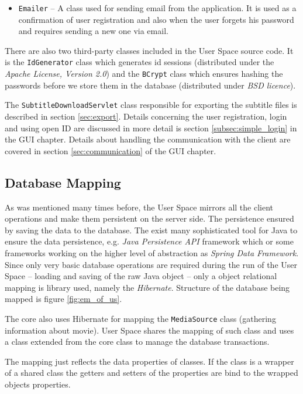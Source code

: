 \begin{itemize}
\item {\tt Emailer} -- A class used for sending email from the application. It is used as a confirmation of user registration and also when the user forgets his password and requires sending a new one via email.

\end{itemize}

There are also two third-party classes included in the User Space source code. It is the {\tt IdGenerator} class which generates id sessions (distributed under the {\it Apache License, Version 2.0}) and the {\tt BCrypt} class which ensures hashing the passwords before we store them in the database (distributed under {\it BSD licence}).

The {\tt SubtitleDownloadServlet} class responsible for exporting the subtitle files is described in section \ref{sec:export}. Details concerning the user registration, login and using open ID are discussed in more detail is section \ref{subsec:simple_login} in the GUI chapter. Details about handling the communication with the client are covered in section \ref{sec:communication} of the GUI chapter.

\subsection{Database Mapping}
\label{subsec:database_mapping}

As was mentioned many times before, the User Space mirrors all the client operations and make them persistent on the server side. The persistence ensured by saving the data to the database. The exist many sophisticated tool for Java to ensure the data persistence, e.g. \emph{Java Persistence API} framework which or some frameworks working on the higher level of abstraction as \emph{Spring Data Framework}. Since only very basic database operations are required during the run of the User Space -- loading and saving of the raw Java object -- only a object relational mapping is library used, namely the \emph{Hibernate}. Structure of the database being mapped is figure \ref{fig:em_of_us}.

The core also uses Hibernate for mapping the {\tt MediaSource} class (gathering information about movie). User Space shares the mapping of such class and uses a class extended from the core class to manage the database transactions.

The mapping just reflects the data properties of classes. If the class is a wrapper of a shared class the getters and setters of the properties are bind to the wrapped objects properties.

